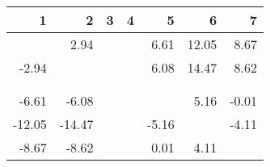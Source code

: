 \begin{table}[ht]
\centering
\begin{tabular}{rrrrrrr}
  \hline
1 & 2 & 3 & 4 & 5 & 6 & 7 \\ 
  \hline
 & 2.94 &  &  & 6.61 & 12.05 & 8.67 \\ 
  -2.94 &  &  &  & 6.08 & 14.47 & 8.62 \\ 
   &  &  &  &  &  &  \\ 
   &  &  &  &  &  &  \\ 
  -6.61 & -6.08 &  &  &  & 5.16 & -0.01 \\ 
  -12.05 & -14.47 &  &  & -5.16 &  & -4.11 \\ 
  -8.67 & -8.62 &  &  & 0.01 & 4.11 &  \\ 
   \hline
\end{tabular}
\end{table}
